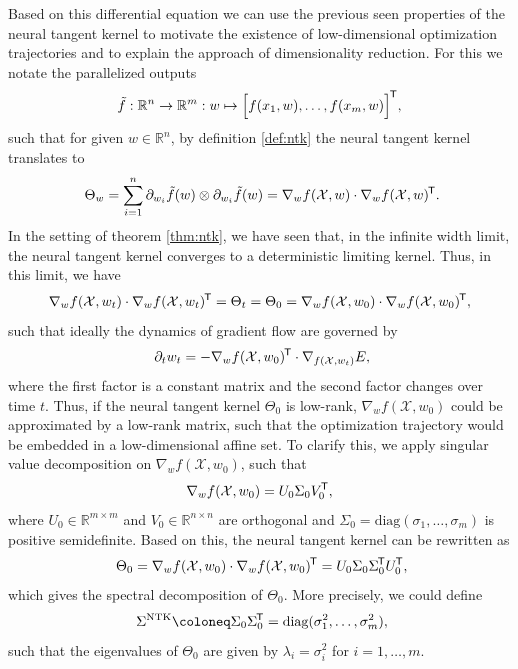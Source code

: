 \documentclass[11pt, a4paper]{article}
\newcommand{\R}{\mathbb{R}}
\newcommand{\X}{\mathcal{X}}
\newcommand*{\tr}{^{\mkern-1.5mu\mathsf{T}}}
\begin{document}
Based on this differential equation we can use the previous seen properties of the neural tangent kernel to motivate the existence of low-dimensional optimization trajectories and to explain the approach of dimensionality reduction. For this we notate the parallelized outputs
\[ \tilde{f}: \R^{n} \to \R^m : w \mapsto \Big [ f(x_1,w), \dots, f(x_m,w) \Big ]\tr , \]
such that for given $w \in \R^n$, by definition \ref{def:ntk} the neural tangent kernel translates to
\[ \Theta_{w} = \sum_{i=1}^{n} \partial_{w_i} \tilde{f}(w) \otimes \partial_{w_i} \tilde{f}(w) = \nabla_wf(\X,w) \cdot \nabla_wf(\X,w)\tr. \]
In the setting of theorem \ref{thm:ntk}, we have seen that, in the infinite width limit, the neural tangent kernel converges to a deterministic limiting kernel. Thus, in this limit, we have
\[ \nabla_wf(\X,w_t) \cdot \nabla_wf(\X,w_t)\tr = \Theta_t = \Theta_0 = \nabla_wf(\X,w_0) \cdot \nabla_wf(\X,w_0)\tr, \] 
such that ideally the dynamics of gradient flow are governed by
\[ \partial_tw_t = - \nabla_w f(\X, w_0)\tr \cdot \nabla_{f(\X,w_t)} E, \]
where the first factor is a constant matrix and the second factor changes over time $t$. Thus, if the neural tangent kernel $\Theta_0$ is low-rank, $\nabla_wf(\X,w_0)$ could be approximated by a low-rank matrix, such that the optimization trajectory would be embedded in a low-dimensional affine set. To clarify this, we apply singular value decomposition on $\nabla_wf(\X,w_0)$, such that 
\[ \nabla_wf(\X,w_0) = U_0 \Sigma_0 V_0\tr , \]
where $U_0 \in \R^{m \times m}$ and $V_0 \in \R^{n \times n}$ are orthogonal and $\Sigma_0 = \text{diag}(\sigma_1, \dots, \sigma_m)$ is positive semidefinite. Based on this, the neural tangent kernel can be rewritten as
\[ \Theta_0 = \nabla_wf(\X,w_0) \cdot \nabla_wf(\X,w_0)\tr  = U_0 \Sigma_0 \Sigma_0\tr  U_0\tr, \]
which gives the spectral decomposition of $\Theta_0$. More precisely, we could define
\[ \Sigma^\text{NTK} \coloneq \Sigma_0 \Sigma_0 \tr = \text{diag}(\sigma_1^2, \dots, \sigma_m^2), \]
such that the eigenvalues of $\Theta_0$ are given by $\lambda_i = \sigma_i^2$ for $i=1, \dots, m$.
\end{document}
